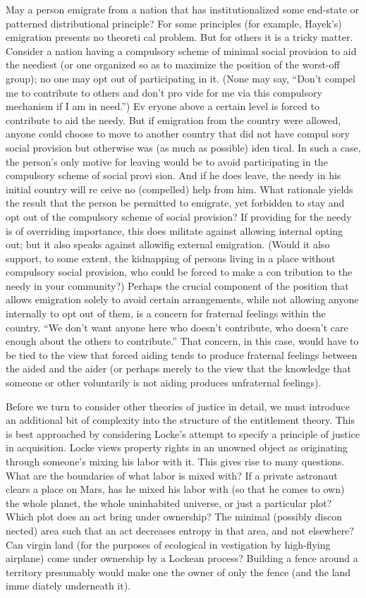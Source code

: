 \documentclass[11pt,openany]{book}
\begin{document}
May a person emigrate from a nation that has institutionalized some end-state or patterned distributional principle? For some principles (for example, Hayek's) emigration presents no theoreti cal problem. But for others it is a tricky matter. Consider a nation having a compulsory scheme of minimal social provision to aid the neediest (or one organized so as to maximize the position of the worst-off group); no one may opt out of participating in it. (None may say, ``Don't compel me to contribute to others and don't pro vide for me via this compulsory mechanism if I am in need.'') Ev eryone above a certain level is forced to contribute to aid the needy. But if emigration from the country were allowed, anyone could choose to move to another country that did not have compul sory social provision but otherwise was (as much as possible) iden tical. In such a case, the person's only motive for leaving would be to avoid participating in the compulsory scheme of social provi sion. And if he does leave, the needy in his initial country will re ceive no (compelled) help from him. What rationale yields the result that the person be permitted to emigrate, yet forbidden to stay and opt out of the compulsory scheme of social provision? If providing for the needy is of overriding importance, this does militate against allowing internal opting out; but it also speaks against allowifig external emigration. (Would it also support, to some extent, the kidnapping of persons living in a place without compulsory social provision, who could be forced to make a con tribution to the needy in your community?) Perhaps the crucial component of the position that allows emigration solely to avoid certain arrangements, while not allowing anyone internally to opt out of them, is a concern for fraternal feelings within the country. ``We don't want anyone here who doesn't contribute, who doesn't care enough about the others to contribute.'' That concern, in this case, would have to be tied to the view that forced aiding tends to produce fraternal feelings between the aided and the aider (or perhaps merely to the view that the knowledge that someone or other voluntarily is not aiding produces unfraternal feelings). 

Before we turn to consider other theories of justice in detail, we must introduce an additional bit of complexity into the structure of the entitlement theory. This is best approached by considering Locke's attempt to specify a principle of justice in acquisition. Locke views property rights in an unowned object as originating through someone's mixing his labor with it. This gives rise to many questions. What are the boundaries of what labor is mixed with? If a private astronaut clears a place on Mars, has he mixed his labor with (so that he comes to own) the whole planet, the whole uninhabited universe, or just a particular plot? Which plot does an act bring under ownership? The minimal (possibly discon nected) area such that an act decreases entropy in that area, and not elsewhere? Can virgin land (for the purposes of ecological in vestigation by high-flying airplane) come under ownership by a Lockean process? Building a fence around a territory presumably would make one the owner of only the fence (and the land imme diately underneath it). 
\end{document}
